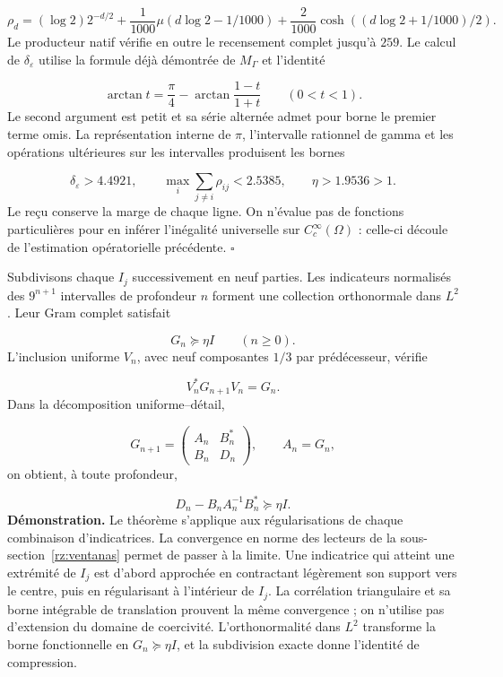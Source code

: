 \[
\rho_d=(\log2)2^{-d/2}
+\frac1{1000}\mu(d\log2-1/1000)
+\frac2{1000}\cosh((d\log2+1/1000)/2).
\]
Le producteur natif vérifie en outre le recensement complet jusqu'à \(259\). Le calcul de \(\delta_\varepsilon\) utilise la formule déjà démontrée de \(M_\Gamma\) et l'identité

\[
\arctan t=\frac\pi4-
\arctan\frac{1-t}{1+t}\qquad(0<t<1).
\]
Le second argument est petit et sa série alternée admet pour borne le premier terme omis. La représentation interne de \(\pi\), l'intervalle rationnel de gamma et les opérations ultérieures sur les intervalles produisent les bornes

\[
\delta_\varepsilon>4.4921,\qquad
\max_i\sum_{j\neq i}\rho_{ij}<2.5385,\qquad
\eta>1.9536>1.
\]
Le reçu conserve la marge de chaque ligne. On n'évalue pas de fonctions particulières pour en inférer l'inégalité universelle sur \(C_c^\infty(\Omega)\) : celle-ci découle de l'estimation opératorielle précédente. \hfill\(\square\)

Subdivisons chaque \(I_j\) successivement en neuf parties. Les indicateurs normalisés des \(9^{n+1}\) intervalles de profondeur \(n\) forment une collection orthonormale dans \(L^2\). Leur Gram complet satisfait

\[
G_n\succeq\eta I\qquad(n\geq0).
\]
L'inclusion uniforme \(V_n\), avec neuf composantes \(1/3\) par prédécesseur, vérifie

\[
V_n^*G_{n+1}V_n=G_n.
\]
Dans la décomposition uniforme–détail,

\[
G_{n+1}=\begin{pmatrix}A_n&B_n^*\\B_n&D_n\end{pmatrix},
\qquad A_n=G_n,
\]
on obtient, à toute profondeur,

\[
\boxed{D_n-B_nA_n^{-1}B_n^*\succeq\eta I.}
\]
\textbf{Démonstration.} Le théorème s’applique aux régularisations de chaque combinaison d’indicatrices. La convergence en norme des lecteurs de la sous-section~\ref{rz:ventanas} permet de passer à la limite. Une indicatrice qui atteint une extrémité de \(I_j\) est d’abord approchée en contractant légèrement son support vers le centre, puis en régularisant à l’intérieur de \(I_j\). La corrélation triangulaire et sa borne intégrable de translation prouvent la même convergence ; on n’utilise pas d’extension du domaine de coercivité. L’orthonormalité dans \(L^2\) transforme la borne fonctionnelle en \(G_n\succeq\eta I\), et la subdivision exacte donne l’identité de compression.

